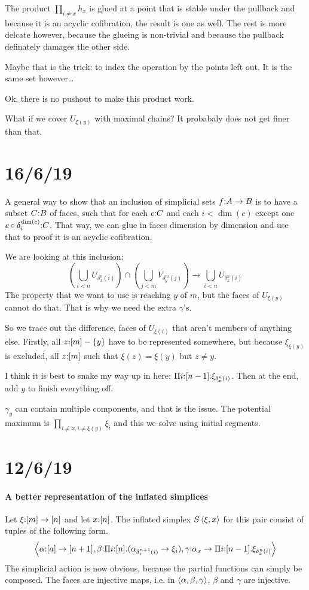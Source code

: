\documentclass[csh.tex]{subfiles}
\begin{document}
The product $\prod_{i\neq x} h_x$ is glued at a point that is stable under 
the pullback and because it is an acyclic cofibration, the result is one as
well. The rest is more delcate however, because the glueing is non-trivial and
because the pullback definately damages the other side.

Maybe that is the trick: to index the operation by the points left out.
It is the same set however\dots

Ok, there is no pushout to make this product work.

What if we cover $U_{\xi(y)}$ with maximal chains?
It probabaly does not get finer than that.

\section{16/6/19}
A general way to show that an inclusion of simplicial sets $f\mathord : A \to B$ is to 
have a subset $C\mathord : B$ of faces, such that for each $c\mathord : C$ and each 
$i<\dim(c)$ except one $c\circ \delta^{\dim(c)}_i\mathord : C$. That way, we can glue
in faces dimension by dimension and use that to proof it is an acyclic 
cofibration.

We are looking at this inclusion:
\[(\bigcup_{i<n} U_{\delta^n_x(i)}) \cap (\bigcup_{j<m} V_{\delta^m_y(j)}) \to \bigcup_{i<n} U_{\delta^n_x(i)}\]
The property that we want to use is reaching $y$ of $m$, but the faces of 
$U_{\xi(y)}$ cannot do that. That is why we need the extra $\gamma$'s.

So we trace out the difference, faces of $U_{\xi(i)}$ that aren't members of
anything else. Firstly, all $z\mathord : [m]-\left\{y\right\}$ have to be represented somewhere,
but because $\xi_{\xi(y)}$ is excluded, all $z \mathord : [m]$ such that 
$\xi(z) = \xi(y)$ but $z\neq y$. 

I think it is best to snake my way up in here:
$\Pi i\mathord :[n-1] .\xi_{\delta^n_x(i)}$. Then at the end, add $y$ to finish
everything off.

$\gamma_y$ can contain multiple components, and that is the issue. The potential
 maximum is $\prod_{i\neq x,i\neq \xi(y)} \xi_i$ and this we solve using
 initial segments.

\section{12/6/19}

\paragraph{A better representation of the inflated simplices}
Let $\xi\mathord : [m]\to[n]$ and let $x\mathord :[n]$. The inflated simplex $S\left\langle \xi,x \right\rangle$
 for this pair consist of tuples of the following form. 
\[\left\langle 
  \alpha\mathord :[a]\to[n+1], 
  \beta\mathord :\Pi i\mathord :[n] .(\alpha_{\delta^{n+1}_x(i)} \to \xi_{i}),
  \gamma\mathord :\alpha_x \to \Pi i\mathord :[n-1] .\xi_{\delta^n_x(i)}
 \right\rangle\]
The simplicial action is now obvious, because the partial functions can simply 
be composed. The faces are injective maps, i.e. in 
$\left\langle \alpha,\beta,\gamma \right\rangle$, $\beta$ and $\gamma$ are injective.
\end{document}
